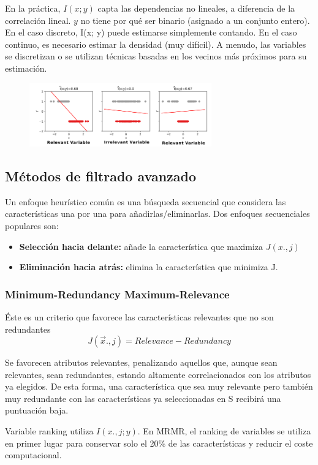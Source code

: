 En la práctica, $I(x;y)$ capta las dependencias no lineales, a diferencia de la correlación lineal. $y$ no tiene por qué ser binario (asignado a un conjunto entero). En el caso discreto, I(x; y) puede estimarse simplemente contando. En el caso continuo, es necesario estimar la densidad (muy difícil). A menudo, las variables se discretizan o se utilizan técnicas basadas en los vecinos más próximos para su estimación.

\begin{figure}[h]
\centering
\includegraphics[width = 0.7\textwidth]{figs/mutual-information-practice.png}
\end{figure}

\subsection{Métodos de filtrado avanzado}
Un enfoque heurístico común es una búsqueda secuencial que considera las características una por una para añadirlas/eliminarlas.
Dos enfoques secuenciales populares son:
\begin{itemize}
\item \textbf{Selección hacia delante:} añade la característica que maximiza $J(x., j)$
\item \textbf{Eliminación hacia atrás:} elimina la característica que minimiza J.
\end{itemize}

\subsubsection{Minimum-Redundancy Maximum-Relevance}
Éste es un criterio que favorece las características relevantes que no son redundantes
$$J(\vec{x}., j) = Relevance - Redundancy$$

Se favorecen atributos relevantes, penalizando aquellos que, aunque sean relevantes, sean redundantes, estando altamente correlacionados con los atributos ya elegidos. De esta forma, una característica que sea muy relevante pero también muy redundante con las características ya seleccionadas en S recibirá una puntuación baja.

Variable ranking utiliza $I(x.,j; y)$. En MRMR, el ranking de variables se utiliza en primer lugar para conservar solo el 20\% de las características y reducir el coste computacional.

